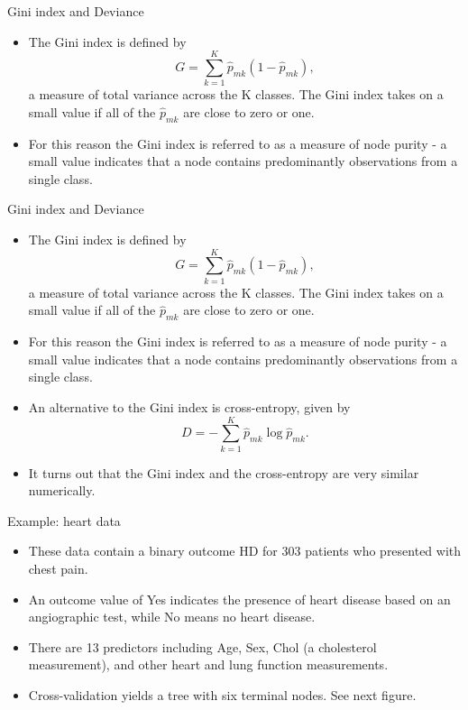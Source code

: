 \documentclass[aspectratio=169, 11pt]{beamer}
\begin{document}
\begin{frame}{Gini index and Deviance}
\begin{itemize}
    \item The Gini index is defined by
    \begin{equation*}
    G=\sum_{k=1}^{K}\hat{p}_{mk}(1-\hat{p}_{mk}),
    \end{equation*}
    a measure of total variance across the K classes. The Gini index takes on a small value if all of the $\hat{p}_{mk}$ are close to zero or one.
    \item For this reason the Gini index is referred to as a measure of node purity - a small value indicates that a node contains predominantly observations from a single class.
\end{itemize}
\end{frame}

\begin{frame}{Gini index and Deviance}
\begin{itemize}
    \item The Gini index is defined by
    \begin{equation*}
    G=\sum_{k=1}^{K}\hat{p}_{mk}(1-\hat{p}_{mk}),
    \end{equation*}
    a measure of total variance across the K classes. The Gini index takes on a small value if all of the $\hat{p}_{mk}$ are close to zero or one.
    \item For this reason the Gini index is referred to as a measure of node purity - a small value indicates that a node contains predominantly observations from a single class.
    \item An alternative to the Gini index is cross-entropy, given by
    \begin{equation*}
    D=-\sum_{k=1}^{K}\hat{p}_{mk}\log\hat{p}_{mk}.
    \end{equation*}
    \item It turns out that the Gini index and the cross-entropy are very similar numerically.
\end{itemize}
\end{frame}

\begin{frame}{Example: heart data}
\begin{itemize}
    \item These data contain a binary outcome HD for 303 patients who presented with chest pain.
    \item An outcome value of Yes indicates the presence of heart disease based on an angiographic test, while No means no heart disease.
    \item There are 13 predictors including Age, Sex, Chol (a cholesterol measurement), and other heart and lung function measurements.
    \item Cross-validation yields a tree with six terminal nodes. See next figure.
\end{itemize}
\end{frame}
\end{document}
